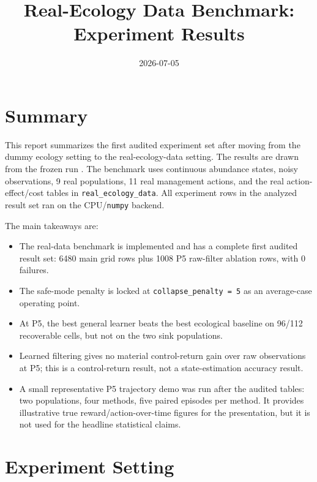 \documentclass[11pt]{article}
\title{Real-Ecology Data Benchmark: Experiment Results}
\author{}
\date{2026-07-05}
\begin{document}
\maketitle

\section{Summary}

This report summarizes the first audited experiment set after moving from the
dummy ecology setting to the real-ecology-data setting. The results are drawn
from the frozen run
. The benchmark uses
continuous abundance states, noisy observations, 9 real populations, 11 real
management actions, and the real action-effect/cost tables in
\texttt{real\_ecology\_data}. All experiment rows in the analyzed result set ran
on the CPU/\texttt{numpy} backend.

The main takeaways are:
\begin{itemize}
    \item The real-data benchmark is implemented and has a complete first
    audited result set: 6480 main grid rows plus 1008 P5 raw-filter ablation
    rows, with 0 failures.
    \item The safe-mode penalty is locked at \texttt{collapse\_penalty = 5} as
    an average-case operating point.
    \item At P5, the best general learner beats the best ecological baseline on
    96/112 recoverable cells, but not on the two sink populations.
    \item Learned filtering gives no material control-return gain over raw
    observations at P5; this is a control-return result, not a state-estimation
    accuracy result.
    \item A small representative P5 trajectory demo was run after the audited
    tables: two populations, four methods, five paired episodes per method.
    It provides illustrative true reward/action-over-time figures for the
    presentation, but it is not used for the headline statistical claims.
\end{itemize}

\section{Experiment Setting}
\end{document}
